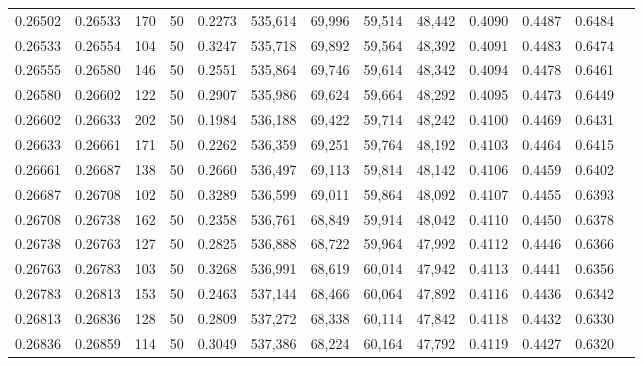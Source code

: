\begin{tabular}{rrrrrrrrrrrrr}
0.26502 & 0.26533 &   170 &  50 &                                     0.2273 & 535,614 &  69,996 &  59,514 &  48,442 & 0.4090 & 0.4487 & 0.6484 \\
0.26533 & 0.26554 &   104 &  50 &                                     0.3247 & 535,718 &  69,892 &  59,564 &  48,392 & 0.4091 & 0.4483 & 0.6474 \\
0.26555 & 0.26580 &   146 &  50 &                                     0.2551 & 535,864 &  69,746 &  59,614 &  48,342 & 0.4094 & 0.4478 & 0.6461 \\
0.26580 & 0.26602 &   122 &  50 &                                     0.2907 & 535,986 &  69,624 &  59,664 &  48,292 & 0.4095 & 0.4473 & 0.6449 \\
0.26602 & 0.26633 &   202 &  50 &                                     0.1984 & 536,188 &  69,422 &  59,714 &  48,242 & 0.4100 & 0.4469 & 0.6431 \\
0.26633 & 0.26661 &   171 &  50 &                                     0.2262 & 536,359 &  69,251 &  59,764 &  48,192 & 0.4103 & 0.4464 & 0.6415 \\
0.26661 & 0.26687 &   138 &  50 &                                     0.2660 & 536,497 &  69,113 &  59,814 &  48,142 & 0.4106 & 0.4459 & 0.6402 \\
0.26687 & 0.26708 &   102 &  50 &                                     0.3289 & 536,599 &  69,011 &  59,864 &  48,092 & 0.4107 & 0.4455 & 0.6393 \\
0.26708 & 0.26738 &   162 &  50 &                                     0.2358 & 536,761 &  68,849 &  59,914 &  48,042 & 0.4110 & 0.4450 & 0.6378 \\
0.26738 & 0.26763 &   127 &  50 &                                     0.2825 & 536,888 &  68,722 &  59,964 &  47,992 & 0.4112 & 0.4446 & 0.6366 \\
0.26763 & 0.26783 &   103 &  50 &                                     0.3268 & 536,991 &  68,619 &  60,014 &  47,942 & 0.4113 & 0.4441 & 0.6356 \\
0.26783 & 0.26813 &   153 &  50 &                                     0.2463 & 537,144 &  68,466 &  60,064 &  47,892 & 0.4116 & 0.4436 & 0.6342 \\
0.26813 & 0.26836 &   128 &  50 &                                     0.2809 & 537,272 &  68,338 &  60,114 &  47,842 & 0.4118 & 0.4432 & 0.6330 \\
0.26836 & 0.26859 &   114 &  50 &                                     0.3049 & 537,386 &  68,224 &  60,164 &  47,792 & 0.4119 & 0.4427 & 0.6320 \\

\end{tabular}
